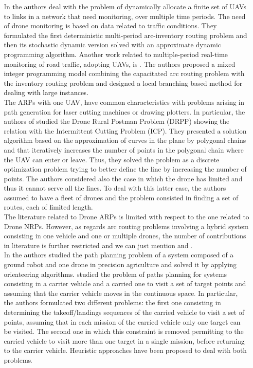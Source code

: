 In \cite{art:Chow2016} the authors deal with the problem of dynamically allocate a finite set of UAVs to links in a network that need monitoring, over multiple time periods. The need of drone monitoring is based on data related to traffic conditions. They formulated the first deterministic multi-period arc-inventory routing problem and then its stochastic dynamic version solved with an approximate dynamic programming algorithm. 
Another work related to multiple-period real-time monitoring of road traffic, adopting UAVs, is \cite{art:Li2018}. The authors proposed a mixed integer programming model combining the capacitated arc routing problem with the inventory routing problem and designed a local branching based method for dealing with large instances.\\
The ARPs with one UAV, have common characteristics with problems arising in path generation for laser cutting machines or drawing plotters. In particular, the authors of \cite{art:Campbell2018} studied the Drone Rural Postman Problem (DRPP) showing the relation with the Intermittent Cutting Problem (ICP). They presented a solution algorithm based on the approximation of curves in the plane by polygonal chains and that iteratively increases the number of points in the polygonal chain where the UAV can enter or leave. Thus, they solved the problem as a discrete optimization problem trying to better define the line by increasing the number of points. The authors considered also the case in which the drone has limited  and thus it cannot serve all the lines. To deal with this latter case, the authors assumed to have a fleet of drones and the problem consisted in finding a set of routes, each of limited length.\\
The literature related to Drone ARPs is limited with respect to the one related to Drone NRPs.
However, as regards arc routing problems involving a hybrid system consisting in one vehicle and one or multiple drones, the number of contributions in literature is further restricted and we can just mention \cite{art:Tokekar2016} and \cite{art:Garone2010}.\\
In \cite{art:Tokekar2016} the authors studied the path planning problem of a system composed of a ground robot and one drone in precision agriculture and solved it by applying orienteering algorithms. \cite{art:Garone2010} studied the problem of paths planning for systems consisting in a carrier vehicle and a carried one to visit a set of target points and assuming that the carrier vehicle moves in the continuous space. In particular, the authors formulated two different problems: the first one consisting in determining the takeoff/landings sequences of the carried vehicle to visit a set of points, assuming that in each mission of the carried vehicle only one target can be visited. The second one in which this constraint is removed permitting to the carried vehicle to visit more than one target in a single mission, before returning to the carrier vehicle. Heuristic approaches have been proposed to deal with both problems.\\
